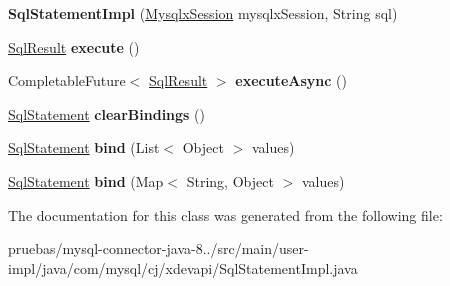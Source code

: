 \begin{DoxyCompactItemize}
\item 
\mbox{\label{classcom_1_1mysql_1_1cj_1_1xdevapi_1_1_sql_statement_impl_a8b75ae45fafd1c45ae83df6f8f8fbaac}} 
{\bfseries Sql\+Statement\+Impl} (\mbox{\hyperlink{classcom_1_1mysql_1_1cj_1_1_mysqlx_session}{Mysqlx\+Session}} mysqlx\+Session, String sql)
\item 
\mbox{\label{classcom_1_1mysql_1_1cj_1_1xdevapi_1_1_sql_statement_impl_abf7f15bd1993d310b1f1522c1c16d984}} 
\mbox{\hyperlink{interfacecom_1_1mysql_1_1cj_1_1xdevapi_1_1_sql_result}{Sql\+Result}} {\bfseries execute} ()
\item 
\mbox{\label{classcom_1_1mysql_1_1cj_1_1xdevapi_1_1_sql_statement_impl_aa041eeb7c8c37ed627555fdd1efd02a7}} 
Completable\+Future$<$ \mbox{\hyperlink{interfacecom_1_1mysql_1_1cj_1_1xdevapi_1_1_sql_result}{Sql\+Result}} $>$ {\bfseries execute\+Async} ()
\item 
\mbox{\label{classcom_1_1mysql_1_1cj_1_1xdevapi_1_1_sql_statement_impl_a88391cba8359c2f03bb97e2b9c60aedd}} 
\mbox{\hyperlink{interfacecom_1_1mysql_1_1cj_1_1xdevapi_1_1_sql_statement}{Sql\+Statement}} {\bfseries clear\+Bindings} ()
\item 
\mbox{\label{classcom_1_1mysql_1_1cj_1_1xdevapi_1_1_sql_statement_impl_a447b9cc7892837bc103804b9f4beb824}} 
\mbox{\hyperlink{interfacecom_1_1mysql_1_1cj_1_1xdevapi_1_1_sql_statement}{Sql\+Statement}} {\bfseries bind} (List$<$ Object $>$ values)
\item 
\mbox{\label{classcom_1_1mysql_1_1cj_1_1xdevapi_1_1_sql_statement_impl_aeabc1e48ee6dc58b527f313c70bc6c0c}} 
\mbox{\hyperlink{interfacecom_1_1mysql_1_1cj_1_1xdevapi_1_1_sql_statement}{Sql\+Statement}} {\bfseries bind} (Map$<$ String, Object $>$ values)
\end{DoxyCompactItemize}


The documentation for this class was generated from the following file\+:\begin{DoxyCompactItemize}
\item 
pruebas/mysql-\/connector-\/java-\/8../src/main/user-\/impl/java/com/mysql/cj/xdevapi/Sql\+Statement\+Impl.\+java\end{DoxyCompactItemize}
